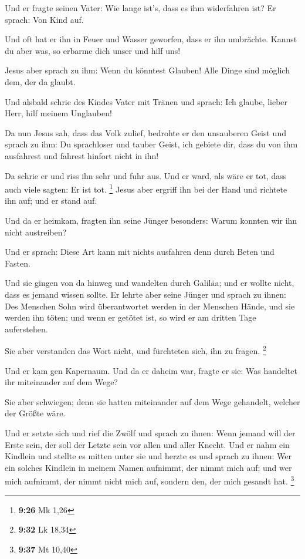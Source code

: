  Und er fragte seinen Vater: Wie lange ist's, dass es ihm
widerfahren ist? Er sprach: Von Kind auf.

 Und oft hat er ihn in Feuer und Wasser geworfen, dass er
ihn umbrächte. Kannst du aber was, so erbarme dich unser und hilf uns!

 Jesus aber sprach zu ihm: Wenn du könntest Glauben! Alle
Dinge sind möglich dem, der da glaubt.

 Und alsbald schrie des Kindes Vater mit Tränen und
sprach: Ich glaube, lieber Herr, hilf meinem Unglauben!

 Da nun Jesus sah, dass das Volk zulief, bedrohte er den
unsauberen Geist und sprach zu ihm: Du sprachloser und tauber Geist, ich
gebiete dir, dass du von ihm ausfahrest und fahrest hinfort nicht in
ihn!

 Da schrie er und riss ihn sehr und fuhr aus. Und er
ward, als wäre er tot, dass auch viele sagten: Er ist tot. \footnote{\textbf{9:26}
  Mk 1,26}  Jesus aber ergriff ihn bei der Hand und
richtete ihn auf; und er stand auf.

 Und da er heimkam, fragten ihn seine Jünger besonders:
Warum konnten wir ihn nicht austreiben?

 Und er sprach: Diese Art kann mit nichts ausfahren denn
durch Beten und Fasten.

 Und sie gingen von da hinweg und wandelten durch
Galiläa; und er wollte nicht, dass es jemand wissen sollte.
 Er lehrte aber seine Jünger und sprach zu ihnen: Des
Menschen Sohn wird überantwortet werden in der Menschen Hände, und sie
werden ihn töten; und wenn er getötet ist, so wird er am dritten Tage
auferstehen.

 Sie aber verstanden das Wort nicht, und fürchteten sich,
ihn zu fragen. \footnote{\textbf{9:32} Lk 18,34}

 Und er kam gen Kapernaum. Und da er daheim war, fragte
er sie: Was handeltet ihr miteinander auf dem Wege?

 Sie aber schwiegen; denn sie hatten miteinander auf dem
Wege gehandelt, welcher der Größte wäre.

 Und er setzte sich und rief die Zwölf und sprach zu
ihnen: Wenn jemand will der Erste sein, der soll der Letzte sein vor
allen und aller Knecht.  Und er nahm ein Kindlein und
stellte es mitten unter sie und herzte es und sprach zu ihnen:
 Wer ein solches Kindlein in meinem Namen aufnimmt, der
nimmt mich auf; und wer mich aufnimmt, der nimmt nicht mich auf, sondern
den, der mich gesandt hat. \footnote{\textbf{9:37} Mt 10,40}

